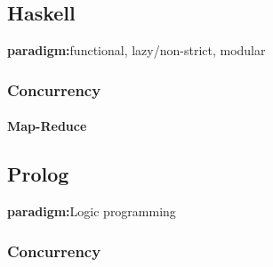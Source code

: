 \documentclass[a4paper,oneside]{report}
\begin{document}
	\subsection{Haskell}

		\textbf{paradigm:}functional, lazy/non-strict, modular

		\subsubsection{Concurrency}
			\paragraph{Map-Reduce}

	\subsection{Prolog}

		\textbf{paradigm:}Logic programming

		\subsubsection{Concurrency}
\end{document}
